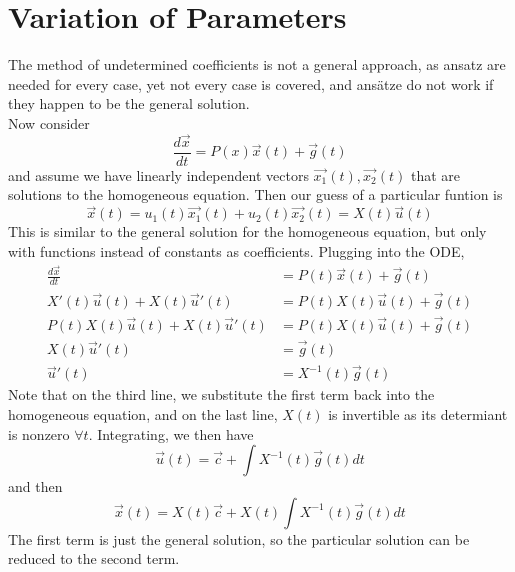 \documentclass[12pt]{article}
\begin{document}
\section{Variation of Parameters}
The method of undetermined coefficients is not a general approach, as ansatz are needed for every case, yet not every case is covered, and ans\"atze do not work if they happen to be the general solution. \\
Now consider
$$\frac{d\vec{x}}{dt} = P(x)\vec{x}(t) + \vec{g}(t)$$
and assume we have linearly independent vectors $\vec{x_1}(t), \vec{x_2}(t)$ that are solutions to the homogeneous equation. Then our guess of a particular funtion is
$$\vec{x}(t) = u_1(t)\vec{x_1}(t) + u_2(t)\vec{x_2}(t) = X(t)\vec{u}(t)$$
This is similar to the general solution for the homogeneous equation, but only with functions instead of constants as coefficients. Plugging into the ODE,
\begin{align*}
	\frac{d\vec{x}}{dt} &= P(t)\vec{x}(t) + \vec{g}(t) \\
	X'(t)\vec{u}(t) + X(t)\vec{u}'(t) &= P(t)X(t)\vec{u}(t) + \vec{g}(t) \\
	P(t)X(t)\vec{u}(t) + X(t)\vec{u}'(t) &= P(t)X(t)\vec{u}(t) + \vec{g}(t) \\
	X(t)\vec{u}'(t) &= \vec{g}(t) \\
	\vec{u}'(t) &= X^{-1}(t)\vec{g}(t)
\end{align*}
Note that on the third line, we substitute the first term back into the homogeneous equation, and on the last line, $X(t)$ is invertible as its determiant is nonzero $\forall t$. Integrating, we then have
$$\vec{u}(t) = \vec{c} + \int X^{-1}(t)\vec{g}(t)dt$$
and then
$$\vec{x}(t) = X(t)\vec{c} + X(t)\int X^{-1}(t)\vec{g}(t)dt$$
The first term is just the general solution, so the particular solution can be reduced to the second term.
\end{document}
